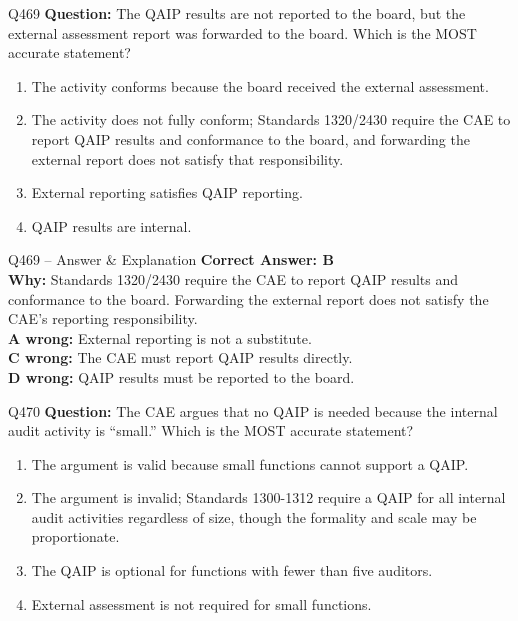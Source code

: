 \documentclass[aspectratio=169,10pt]{beamer}
\begin{document}
	\begin{frame}[t]{Q469}
		\small
		\textbf{Question:} The QAIP results are not reported to the board, but the external assessment report was forwarded to the board. Which is the MOST accurate statement?
		\begin{enumerate}[label=\Alph*.,itemsep=1pt,topsep=2pt]
			\item The activity conforms because the board received the external assessment.
			\item The activity does not fully conform; Standards 1320/2430 require the CAE to report QAIP results and conformance to the board, and forwarding the external report does not satisfy that responsibility.
			\item External reporting satisfies QAIP reporting.
			\item QAIP results are internal.
		\end{enumerate}
	\end{frame}
	
	\begin{frame}[t]{Q469 -- Answer \& Explanation}
		\small
		\textbf{Correct Answer: B} \\[4pt]
		\textbf{Why:} Standards 1320/2430 require the CAE to report QAIP results and conformance to the board. Forwarding the external report does not satisfy the CAE's reporting responsibility. \\[4pt]
		\textbf{A wrong:} External reporting is not a substitute. \\[2pt]
		\textbf{C wrong:} The CAE must report QAIP results directly. \\[2pt]
		\textbf{D wrong:} QAIP results must be reported to the board.
	\end{frame}
	
	\begin{frame}[t]{Q470}
		\small
		\textbf{Question:} The CAE argues that no QAIP is needed because the internal audit activity is ``small.'' Which is the MOST accurate statement?
		\begin{enumerate}[label=\Alph*.,itemsep=1pt,topsep=2pt]
			\item The argument is valid because small functions cannot support a QAIP.
			\item The argument is invalid; Standards 1300-1312 require a QAIP for all internal audit activities regardless of size, though the formality and scale may be proportionate.
			\item The QAIP is optional for functions with fewer than five auditors.
			\item External assessment is not required for small functions.
		\end{enumerate}
	\end{frame}
	
\end{document}
